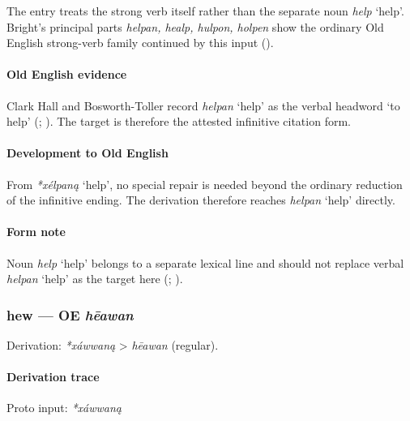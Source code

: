 \documentclass[
  british,
  a4paper,
]{article}
\providecommand{\Recon}[1]{\emph{*#1}}
\begin{document}
The entry treats the strong verb itself rather than the separate noun
{\emph{help}} `help'. Bright's principal parts \emph{helpan, healp,
hulpon, holpen} show the ordinary Old English strong-verb family
continued by this input ().

\paragraph{Old English evidence}\label{old-english-evidence-37}

Clark Hall and Bosworth-Toller record {\emph{helpan}} `help' as the
verbal headword `to help' (; ). The target is therefore the attested infinitive citation form.

\paragraph{Development to Old
English}\label{development-to-old-english-37}

From \Recon{xélpaną} `help', no special repair is needed beyond the
ordinary reduction of the infinitive ending. The derivation therefore
reaches {\emph{helpan}} `help' directly.

\paragraph{Form note}\label{form-note-8}

Noun {\emph{help}} `help' belongs to a separate lexical line and should
not replace verbal {\emph{helpan}} `help' as the target here
(;
).

\subsubsection{\texorpdfstring{hew --- OE
\emph{hēawan}}{hew --- OE hēawan}}\label{hew-oe-hux113awan}

Derivation: \emph{*xáwwaną} \textgreater{} \emph{hēawan} (regular).

\paragraph{Derivation trace}\label{derivation-trace-44}

Proto input: \emph{*xáwwaną}
\end{document}

